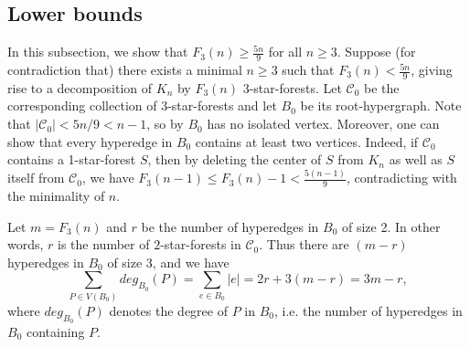 \documentclass{article}
\newcommand{\C}{\mathcal{C}}
\begin{document}
	
\subsection{Lower bounds}\label{subsec:3-star-lowerbound}
In this subsection, we show that $F_3(n)\ge \frac{5n}{9}$ for all $n\ge 3$. Suppose (for contradiction that) there exists a minimal $n\ge3$ such that $F_3(n) < \frac{5n}{9}$, giving rise to a decomposition of $K_n$ by $F_3(n)$ 3-star-forests.  Let $\C_0$ be the corresponding collection of 3-star-forests and let $B_0$ be its root-hypergraph. Note that $|\C_0|<5n/9<n-1$, so by  $B_0$ has no isolated vertex. Moreover, one can show that every hyperedge in $B_0$ contains at least two vertices. Indeed, if $\C_0$ contains a 1-star-forest $S$, then by deleting the center of $S$ from $K_n$ as well as $S$ itself from $\C_0$, we have $F_3(n-1)\le F_3(n)-1 < \frac{5(n-1)}{9}$, contradicting with the minimality of $n$.
	
Let $m=F_3(n)$ and $r$ be the number of hyperedges in $B_0$ of size 2. In other words, $r$ is the number of $2$-star-forests in $\C_0$. Thus there are $(m-r)$ hyperedges in $B_0$ of size 3, and we have
$$
\sum_{P\in V(B_0)}deg_{B_0}(P)=\sum_{e\in B_0}|e|=2r+3(m-r)=3m-r,
$$
where $deg_{B_0}(P)$ denotes the degree of $P$ in $B_0$, i.e. the number of hyperedges in $B_0$ containing $P$.
	
\end{document}
